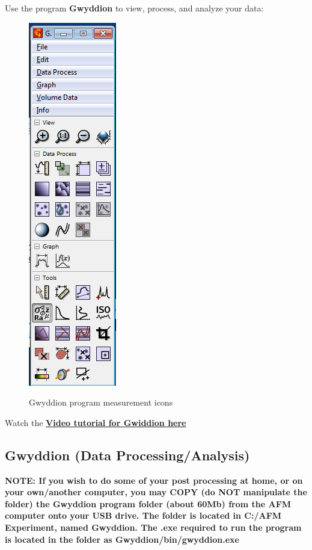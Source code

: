 \documentclass{../lab}
\begin{document}
Use the program \textbf{Gwyddion} to view, process, and analyze your data:
\begin{figure}[H]
    \centering
    \href{http://experimentationlab.berkeley.edu/sites/default/files/AFMImages/39.png}{\includegraphics[width=0.3\linewidth]{images/39.png}}
    \caption{Gwyddion program measurement icons}
    \label{fig:GwyddionProgram}
\end{figure}

Watch the \href{http://experimentationlab.berkeley.edu/sites/default/files/AFMImages/gwyddion1.mp4.mp4}{\textbf{Video tutorial for Gwiddion here}}

\subsection{Gwyddion (Data Processing/Analysis)}
\label{subsec:Gwyddion}

\textbf{NOTE: If you wish to do some of your post processing at home, or on your own/another computer, you may COPY (do NOT manipulate the folder) the Gwyddion program folder (about 60Mb) from the AFM computer onto your USB drive.  The folder is located in C:/AFM Experiment, named Gwyddion.  The .exe required to run the program is located in the folder as Gwyddion/bin/gwyddion.exe}
\end{document}
